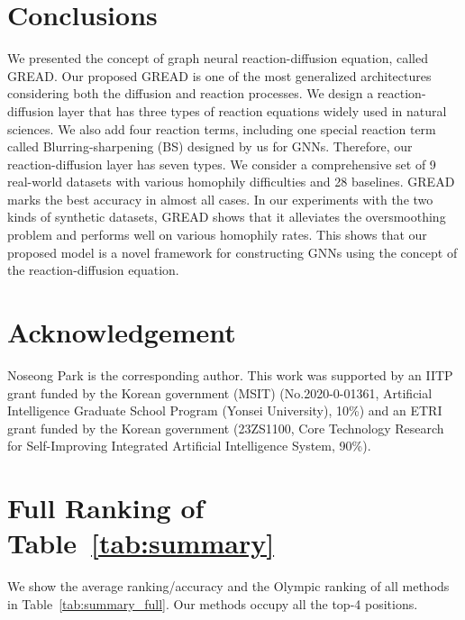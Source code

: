 \documentclass{article}
\theoremstyle{plain}
\theoremstyle{definition}
\theoremstyle{remark}
\begin{document}
\section{Conclusions}
We presented the concept of graph neural reaction-diffusion equation, called GREAD. Our proposed GREAD is one of the most generalized architectures considering both the diffusion and reaction processes. We design a reaction-diffusion layer that has three types of reaction equations widely used in natural sciences. We also add four reaction terms, including one special reaction term called Blurring-sharpening (BS) designed by us for GNNs. Therefore, our reaction-diffusion layer has seven types. We consider a comprehensive set of 9 real-world datasets with various homophily difficulties and 28 baselines. GREAD marks the best accuracy in almost all cases. In our experiments with the two kinds of synthetic datasets, GREAD shows that it alleviates the oversmoothing problem and performs well on various homophily rates. This shows that our proposed model is a novel framework for constructing GNNs using the concept of the reaction-diffusion equation.

\section*{Acknowledgement}
Noseong Park is the corresponding author. This work was supported by an IITP grant funded by the Korean government (MSIT) (No.2020-0-01361, Artificial Intelligence Graduate School Program (Yonsei University), 10\%) and an ETRI grant funded by the Korean government (23ZS1100, Core Technology Research for Self-Improving Integrated Artificial Intelligence System, 90\%).





\clearpage
\onecolumn
\appendix


\section{Full Ranking of Table~\ref{tab:summary}}\label{a:full_rank}
We show the average ranking/accuracy and the Olympic ranking of all methods in Table~\ref{tab:summary_full}. Our methods occupy all the top-4 positions.
\end{document}
